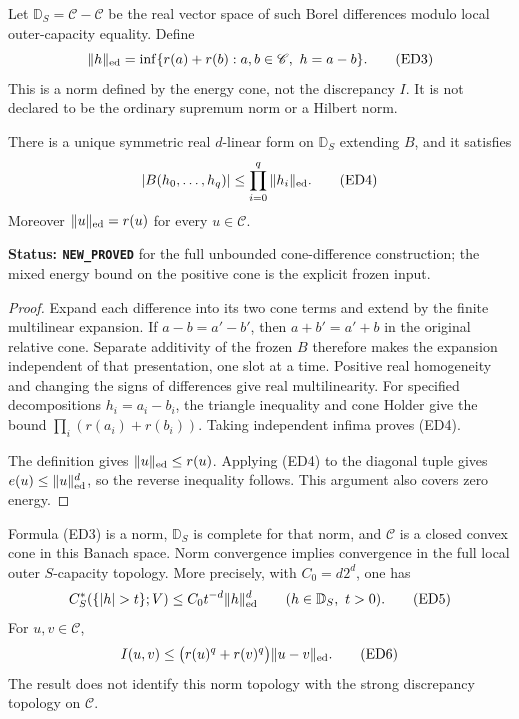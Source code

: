 \begin{definition}
\label{def:r12-energy-difference}
Let $\mathbb D_S=\mathscr C-\mathscr C$ be the real vector space of
such Borel differences modulo local outer-capacity equality. Define
\[
 \|h\|_{\rm ed}
   =\inf\{r(a)+r(b):a,b\in\mathscr C,\ h=a-b\}.
 \tag{ED3}
\]
This is a norm defined by the energy cone, not the discrepancy $I$.
It is not declared to be the ordinary supremum norm or a Hilbert norm.
\end{definition}

\begin{lemma}
\label{lem:r12-difference-mixed-extension}
There is a unique symmetric real $d$-linear form on $\mathbb D_S$
extending $B$, and it satisfies
\[
       |B(h_0,\ldots,h_q)|\leq\prod_{i=0}^q\|h_i\|_{\rm ed}.
 \tag{ED4}
\]
Moreover $\|u\|_{\rm ed}=r(u)$ for every $u\in\mathscr C$.
\end{lemma}

\noindent\textbf{Status: \texttt{NEW\_PROVED}} for the full
unbounded cone-difference construction; the mixed energy bound on
the positive cone is the explicit frozen input.

\begin{proof}
Expand each difference into its two cone terms and extend by the
finite multilinear expansion. If $a-b=a'-b'$, then
$a+b'=a'+b$ in the original relative cone. Separate additivity of
the frozen $B$ therefore makes the expansion independent of that
presentation, one slot at a time. Positive real homogeneity and
changing the signs of differences give real multilinearity.
For specified decompositions $h_i=a_i-b_i$, the triangle inequality
and cone Holder give the bound $\prod_i(r(a_i)+r(b_i))$.
Taking independent infima proves (ED4).

The definition gives $\|u\|_{\rm ed}\leq r(u)$. Applying (ED4)
to the diagonal tuple gives $e(u)\leq\|u\|_{\rm ed}^{d}$, so the
reverse inequality follows. This argument also covers zero energy.
\end{proof}

\begin{theorem}
\label{thm:r12-energy-difference-Banach}
Formula (ED3) is a norm, $\mathbb D_S$ is complete for that norm,
and $\mathscr C$ is a closed convex cone in this Banach space.
Norm convergence implies convergence in the full local outer
$S$-capacity topology. More precisely, with
$C_0=d2^d$, one has
\[
 C_S^*(\{|h|>t\};V)\leq C_0 t^{-d}\|h\|_{\rm ed}^{d}
                    \qquad(h\in\mathbb D_S,\ t>0).
 \tag{ED5}
\]
For $u,v\in\mathscr C$,
\[
 I(u,v)\leq\bigl(r(u)^q+r(v)^q\bigr)\|u-v\|_{\rm ed}.
 \tag{ED6}
\]
The result does not identify this norm topology with the strong
discrepancy topology on $\mathscr C$.
\end{theorem}

